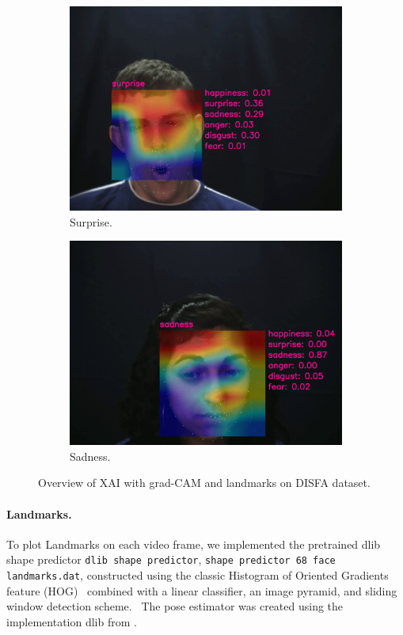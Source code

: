 \begin{figure}[ht]
\begin{subfigure}{0.49\linewidth}
    \includegraphics[width=\linewidth]{GiMeFive03.png}
    \caption{Surprise.}
    \label{fig:v3}
  \end{subfigure}
  \hfill
  \begin{subfigure}{0.49\linewidth}
    \includegraphics[width=\linewidth]{GiMeFive04.png}
    \caption{Sadness.}
    \label{fig:v4}
  \end{subfigure}
  \hfill
  \caption{Overview of XAI with grad-CAM and landmarks on DISFA dataset.}
  \label{fig:video}
\end{figure}

\paragraph{Landmarks.}
To plot Landmarks on each video frame, we implemented the pretrained dlib shape predictor 
\texttt{dlib shape predictor}, %
\texttt{shape predictor 68 face landmarks.dat}, 
constructed using the classic Histogram of Oriented Gradients feature (HOG)~\cite{1467360} combined with a linear classifier, 
an image pyramid, and sliding window detection scheme.~\cite{dlib_site}
The pose estimator was created using the implementation dlib from \citet{6909637}.

